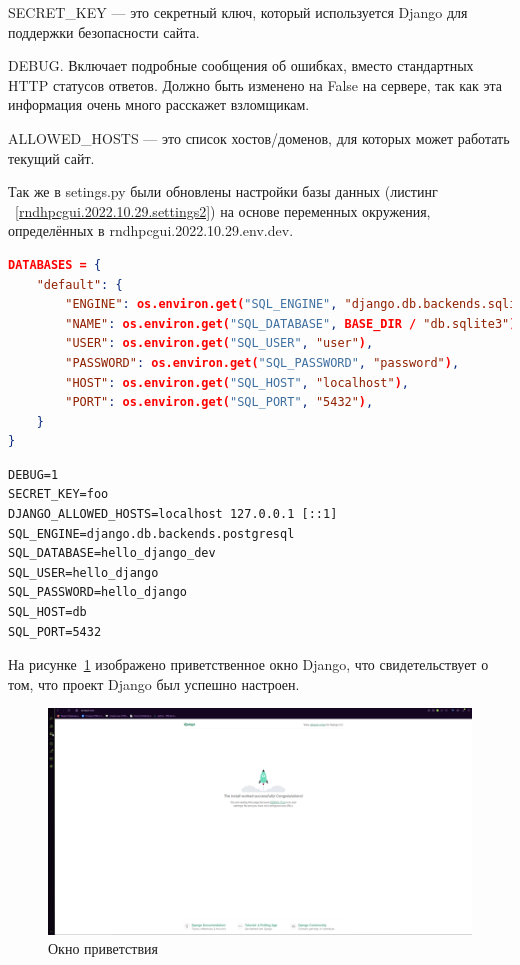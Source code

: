 \textsf{SECRET_KEY} — это секретный ключ, который используется Django для поддержки безопасности сайта.

\textsf{DEBUG}. Включает подробные сообщения об ошибках, вместо стандартных \textsf{HTTP} статусов ответов. Должно быть изменено на \textsf{False} на сервере, так как эта информация очень много расскажет взломщикам.

\textsf{ALLOWED_HOSTS} — это список хостов/доменов, для которых может работать текущий сайт.

Так же в \textsf{setings.py} были обновлены настройки базы данных (листинг ~\ref{rndhpcgui.2022.10.29.settings2}) на основе переменных окружения, определённых в \textsf{rndhpcgui.2022.10.29.env.dev}.

\begin{lstlisting}[frame=single, label={rndhpcgui.2022.10.29.settings2}, caption={Обновлённые переменные в \textsf{settings.py}}, language={json}] 
DATABASES = {
    "default": {
        "ENGINE": os.environ.get("SQL_ENGINE", "django.db.backends.sqlite3"),
        "NAME": os.environ.get("SQL_DATABASE", BASE_DIR / "db.sqlite3"),
        "USER": os.environ.get("SQL_USER", "user"),
        "PASSWORD": os.environ.get("SQL_PASSWORD", "password"),
        "HOST": os.environ.get("SQL_HOST", "localhost"),
        "PORT": os.environ.get("SQL_PORT", "5432"),
    }
}
\end{lstlisting}

\begin{lstlisting}[frame=single, label={rndhpcgui.2022.10.29.env.dev}, caption={Содержимое файла \textsf{.env.dev}}, language={aINIExample}] 
DEBUG=1
SECRET_KEY=foo
DJANGO_ALLOWED_HOSTS=localhost 127.0.0.1 [::1]
SQL_ENGINE=django.db.backends.postgresql
SQL_DATABASE=hello_django_dev
SQL_USER=hello_django
SQL_PASSWORD=hello_django
SQL_HOST=db
SQL_PORT=5432
\end{lstlisting}

На рисунке~\ref{rndhpcgui.2022.10.29.picture2} изображено приветственное окно \textsf{Django}, что свидетельствует о том, что проект \textsf{Django} был успешно настроен.

\begin{figure}[!ht]
  \centering
  \includegraphics[scale=0.8]{ResearchNotes/rndhpc_dev_gui_2022_10_29/picture2.png}
  \caption{Окно приветствия}
  \label{rndhpcgui.2022.10.29.picture2}
\end{figure}


